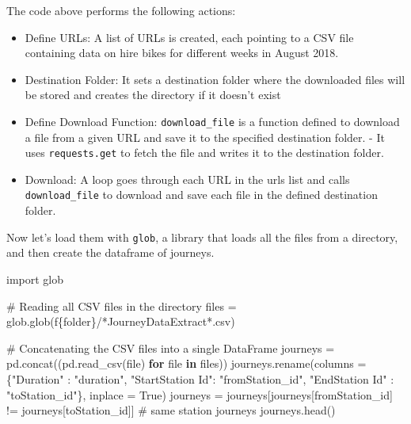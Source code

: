\documentclass[
  letterpaper,
  DIV=11,
  numbers=noendperiod]{scrreprt}
\newenvironment{Shaded}{\begin{snugshade}}{\end{snugshade}}
\newcommand{\BuiltInTok}[1]{\textcolor[rgb]{0.00,0.23,0.31}{#1}}
\newcommand{\CommentTok}[1]{\textcolor[rgb]{0.37,0.37,0.37}{#1}}
\newcommand{\ControlFlowTok}[1]{\textcolor[rgb]{0.00,0.23,0.31}{\textbf{#1}}}
\newcommand{\ImportTok}[1]{\textcolor[rgb]{0.00,0.46,0.62}{#1}}
\newcommand{\KeywordTok}[1]{\textcolor[rgb]{0.00,0.23,0.31}{\textbf{#1}}}
\newcommand{\NormalTok}[1]{\textcolor[rgb]{0.00,0.23,0.31}{#1}}
\newcommand{\OperatorTok}[1]{\textcolor[rgb]{0.37,0.37,0.37}{#1}}
\newcommand{\SpecialCharTok}[1]{\textcolor[rgb]{0.37,0.37,0.37}{#1}}
\newcommand{\SpecialStringTok}[1]{\textcolor[rgb]{0.13,0.47,0.30}{#1}}
\newcommand{\StringTok}[1]{\textcolor[rgb]{0.13,0.47,0.30}{#1}}
\newcommand{\VariableTok}[1]{\textcolor[rgb]{0.07,0.07,0.07}{#1}}
\providecommand{\tightlist}{%
  \setlength{\itemsep}{0pt}\setlength{\parskip}{0pt}}\usepackage{longtable,booktabs,array}
\begin{document}
The code above performs the following actions:

\begin{itemize}
\tightlist
\item
  Define URLs: A list of URLs is created, each pointing to a CSV file
  containing data on hire bikes for different weeks in August 2018.
\item
  Destination Folder: It sets a destination folder where the downloaded
  files will be stored and creates the directory if it doesn't exist
\item
  Define Download Function: \texttt{download\_file} is a function
  defined to download a file from a given URL and save it to the
  specified destination folder. - It uses \texttt{requests.get} to fetch
  the file and writes it to the destination folder.
\item
  Download: A loop goes through each URL in the urls list and calls
  \texttt{download\_file} to download and save each file in the defined
  destination folder.
\end{itemize}

Now let's load them with \texttt{glob}, a library that loads all the
files from a directory, and then create the dataframe of journeys.

\begin{Shaded}
\begin{Highlighting}[]
\ImportTok{import}\NormalTok{ glob}

\CommentTok{\# Reading all CSV files in the directory}
\NormalTok{files }\OperatorTok{=}\NormalTok{ glob.glob(}\SpecialStringTok{f\textquotesingle{}}\SpecialCharTok{\{}\NormalTok{folder}\SpecialCharTok{\}}\SpecialStringTok{/*JourneyDataExtract*.csv\textquotesingle{}}\NormalTok{)}

\CommentTok{\# Concatenating the CSV files into a single DataFrame}
\NormalTok{journeys }\OperatorTok{=}\NormalTok{ pd.concat((pd.read\_csv(}\BuiltInTok{file}\NormalTok{) }\ControlFlowTok{for} \BuiltInTok{file} \KeywordTok{in}\NormalTok{ files))}
\NormalTok{journeys.rename(columns }\OperatorTok{=}\NormalTok{ \{}\StringTok{"Duration"}\NormalTok{ : }\StringTok{"duration"}\NormalTok{, }\StringTok{"StartStation Id"}\NormalTok{: }\StringTok{"fromStation\_id"}\NormalTok{, }\StringTok{"EndStation Id"}\NormalTok{ : }\StringTok{"toStation\_id"}\NormalTok{\}, inplace }\OperatorTok{=} \VariableTok{True}\NormalTok{)}
\NormalTok{journeys }\OperatorTok{=}\NormalTok{ journeys[journeys[}\StringTok{\textquotesingle{}fromStation\_id\textquotesingle{}}\NormalTok{] }\OperatorTok{!=}\NormalTok{ journeys[}\StringTok{\textquotesingle{}toStation\_id\textquotesingle{}}\NormalTok{]] }\CommentTok{\# same station journeys}
\NormalTok{journeys.head()}
\end{Highlighting}
\end{Shaded}
\end{document}
